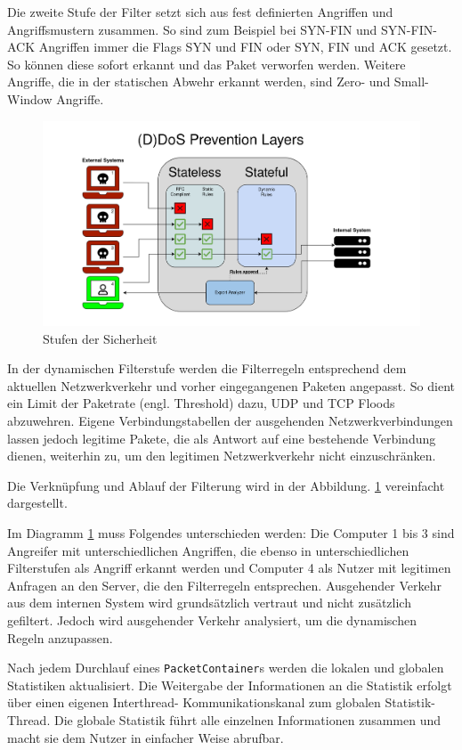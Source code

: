 \documentclass[../review_2.tex]{subfiles}
\begin{document}
Die zweite Stufe der Filter setzt sich aus fest definierten Angriffen und Angriffsmustern zusammen. So sind zum Beispiel bei SYN-FIN und SYN-FIN-ACK Angriffen immer die Flags SYN und FIN oder SYN, FIN und ACK gesetzt. So können diese sofort erkannt und das Paket verworfen werden. Weitere Angriffe, die in der statischen Abwehr erkannt werden, sind Zero- und Small-Window Angriffe.

\begin{figure}[H]
    \centering
    \includegraphics[width=\linewidth]{img/Security_Layers.png}
    \caption{Stufen der Sicherheit}
    \label{security_layers}
\end{figure}

In der dynamischen Filterstufe werden die Filterregeln entsprechend dem aktuellen Netzwerkverkehr und vorher eingegangenen Paketen angepasst. So dient ein Limit der Paketrate (engl. Threshold) dazu, UDP und TCP Floods abzuwehren. Eigene Verbindungstabellen der ausgehenden Netzwerkverbindungen lassen jedoch legitime Pakete, die als Antwort auf eine bestehende Verbindung dienen, weiterhin zu, um den legitimen Netzwerkverkehr nicht einzuschränken.

Die Verknüpfung und Ablauf der Filterung wird in der Abbildung. \ref{security_layers} vereinfacht dargestellt.

Im Diagramm \ref{security_layers} muss Folgendes unterschieden werden: Die Computer 1 bis 3 sind Angreifer mit unterschiedlichen Angriffen, die ebenso in unterschiedlichen Filterstufen als Angriff erkannt werden und Computer 4 als Nutzer mit legitimen Anfragen an den Server, die den Filterregeln entsprechen.
Ausgehender Verkehr aus dem internen System wird grundsätzlich vertraut und nicht zusätzlich gefiltert. Jedoch wird ausgehender Verkehr analysiert, um die dynamischen Regeln anzupassen.

Nach jedem Durchlauf eines \texttt{PacketContainer}s werden die lokalen und globalen Statistiken aktualisiert. Die Weitergabe der Informationen an die Statistik erfolgt über einen eigenen Interthread- Kommunikationskanal zum globalen Statistik-Thread. Die globale Statistik führt alle einzelnen Informationen zusammen und macht sie dem Nutzer in einfacher Weise abrufbar.
\end{document}
